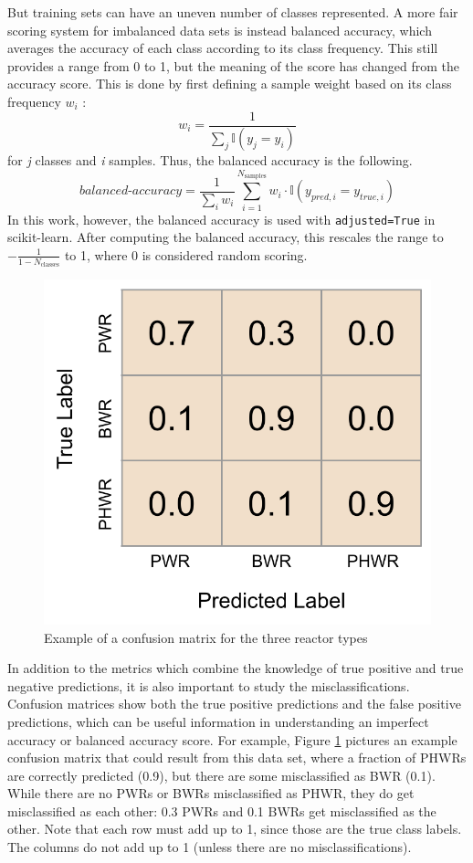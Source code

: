 But training sets can have an uneven number of classes represented.  A more
fair scoring system for imbalanced data sets is instead balanced accuracy,
which averages the accuracy of each class according to its class frequency.
This still provides a range from 0 to 1, but the meaning of the score has
changed from the accuracy score. This is done by first defining a sample weight
based on its class frequency $w_i$ \cite{scikit}: 
\begin{equation}
  w_i = \frac{1}{\sum_j{\mathbb{I}(y_j = y_i)}}
\end{equation}
for \textit{j} classes and \textit{i} samples. Thus, the balanced accuracy is
the following.
\begin{equation}
  \textit{balanced-accuracy} = \frac{1}{\sum_{i}{w_i}} \sum_{i=1}^{N_\text{samples}}
                               w_i \cdot \mathbb{I}(y_{pred, i} = y_{true, i})
\end{equation}
In this work, however, the balanced accuracy is used with
\texttt{adjusted=True} in scikit-learn. After computing the balanced accuracy,
this rescales the range to $-\frac{1}{1-N_\text{classes}}$ to 1, where 0 is
considered random scoring.

\begin{figure}[!htb]
  \centering
  \includegraphics[width=0.4\linewidth]{./chapters/litrev/cm_example.png}
  \caption[Example of a confusion matrix]
          {Example of a confusion matrix for the three reactor types}
  \label{fig:cm_ex}
\end{figure}

In addition to the metrics which combine the knowledge of true positive and
true negative predictions, it is also important to study the
misclassifications. Confusion matrices show both the true positive predictions
and the false positive predictions, which can be useful information in
understanding an imperfect accuracy or balanced accuracy score. For example,
Figure \ref{fig:cm_ex} pictures an example confusion matrix that could result
from this data set, where a fraction of \glspl{PHWR} are correctly predicted
(0.9), but there are some misclassified as \gls{BWR} (0.1).  While there are no
\glspl{PWR} or \glspl{BWR} misclassified as \gls{PHWR}, they do get
misclassified as each other: 0.3 \glspl{PWR} and 0.1 \glspl{BWR} get
misclassified as the other.  Note that each row must add up to 1, since those
are the true class labels. The columns do not add up to 1 (unless there are no
misclassifications).  

